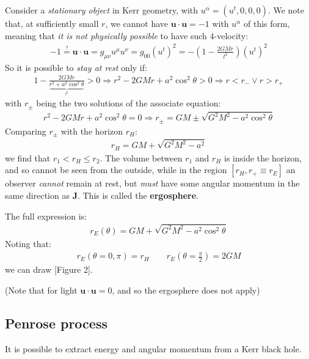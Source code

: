 \documentclass[../template.tex]{subfiles}
\begin{document}
\medskip

Consider a \textit{stationary object} in Kerr geometry, with $u^\alpha = (u^t, 0, 0, 0)$. We note that, at sufficiently small $r$, we cannot have $\bm{u}\cdot \bm{u} = -1$ with $u^\alpha$ of this form, meaning that \textit{it is not physically possible} to have such $4$-velocity:
\begin{align*}
    -1 \overset{?}{=} \bm{u}\cdot\bm{u} = g_{\mu \nu} u^\mu u^\nu = g_{00} (u^t)^2 = -\left(1-\frac{2GMr}{l^2} \right)(u^t)^2
\end{align*}      
So it is possible to \textit{stay at rest} only if:
\begin{align*}
    1-\frac{2GMr}{\underbrace{r^2 + a^2 \cos^2 \theta}_{l^2} }  > 0 \Rightarrow r^2 - 2GMr + a^2 \cos^2 \theta > 0 \Rightarrow r < r_- \lor  r > r_+
\end{align*} 
with $r_\pm$ being the two solutions of the associate equation:
\begin{align*}
    r^2 - 2GMr + a^2 \cos^2 \theta = 0 \Rightarrow r_\pm = GM \pm \sqrt{G^2 M^2 - a^2 \cos^2 \theta}
\end{align*} 
Comparing $r_\pm$ with the horizon $r_H$:
\begin{align*}
    r_H = GM + \sqrt{G^2 M^2 -a^2}
\end{align*}  
we find that $r_1 < r_H \leq r_2$. The volume between $r_1$ and $r_H$ is inside the horizon, and so cannot be seen from the outside, while in the region $[r_H, r_+ \equiv r_E]$ an observer \textit{cannot} remain at rest, but \textit{must} have some angular momentum in the same direction as $\bm{J}$. This is called the \textbf{ergosphere}. 

The full expression is:
\begin{align*}
    r_E(\theta) = GM + \sqrt{G^2 M^2 - a^2 \cos^2 \theta}
\end{align*}
Noting that:
\begin{align*}
    r_E(\theta = 0,\pi) = r_H \qquad r_E\left(\theta= \frac{\pi}{2}   \right) = 2GM
\end{align*}
we can draw [Figure 2].

(Note that for light $\bm{u}\cdot\bm{u} = 0$, and so the ergosphere does not apply)

\subsection{Penrose process}
It is possible to extract energy and angular momentum from a Kerr black hole.
\end{document}

